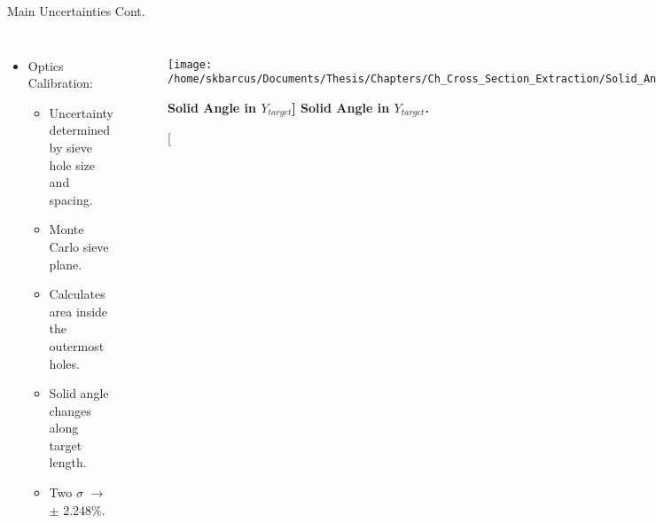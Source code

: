 \documentclass[10pt]{beamer}
\begin{document}
\begin{frame}[fragile]{Main Uncertainties Cont.}

	\begin{columns}[T,onlytextwidth]  
	\begin{itemize}
		\item \alert{Optics Calibration}:
			\begin{itemize}
				\item[--] Uncertainty determined by sieve hole size and spacing.
				\item[--] Monte Carlo sieve plane.
				\item[--] Calculates area inside the outermost holes.
				\item[--] Solid angle changes along target length.
				\item[--] Two $\sigma$ $\rightarrow$ $\pm$ 2.248$\%$.
			\end{itemize}
	\end{itemize}
	
	\vspace{-1mm}
	\begin{figure}[!ht]
	\begin{center}
	\texttt{[image: /home/skbarcus/Documents/Thesis/Chapters/Ch\_Cross\_Section\_Extraction/Solid\_Angle\_Ytarget.png]}
	\end{center}
	\caption[\bf{Solid Angle in $Y_{target}$}]{
	{\bf{Solid Angle in $Y_{target}$.}} }
	\label{fig:3he_fch_no_cut}
	\end{figure}
	
	\begin{figure}[!ht]
	\begin{center}
	\texttt{[image: /home/skbarcus/Documents/Thesis/Chapters/Ch\_Cross\_Section\_Extraction/Sieve\_MC.png]}
	\end{center}
	\caption[\bf{Sieve Plate MC}]{
	{\bf{Sieve Plate MC.}} }
	\label{fig:3he_fch_no_cut}
	\end{figure}
	
	\vspace{-5mm}
	\begin{figure}[!ht]
	\begin{center}
	\texttt{[image: /home/skbarcus/Documents/Thesis/Chapters/Ch\_Cross\_Section\_Extraction/Sieve\_MC\_Gaussian.png]}
	\end{center}
	\caption[\bf{Sieve Plate Areas}]{
	{\bf{Sieve Plate Areas.}} }
	\label{fig:3he_fch_no_cut}
	\end{figure}
	
	\end{columns}
	
\end{frame}
\end{document}
